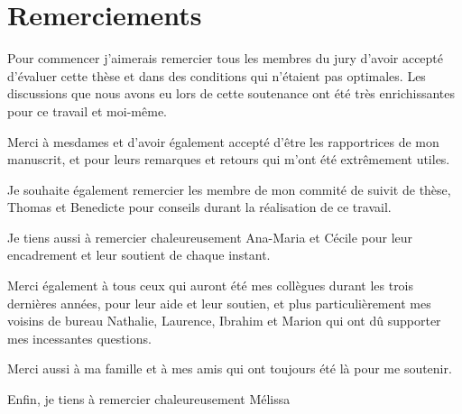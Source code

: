 \section*{Remerciements}

Pour commencer j'aimerais remercier tous les membres du jury d'avoir
accepté d'évaluer cette thèse et dans des conditions qui n'étaient pas
optimales. Les discussions que nous avons eu lors de cette soutenance
ont été très enrichissantes pour ce travail et moi-même.

Merci à mesdames  et  d'avoir
également accepté d'être les rapportrices de mon manuscrit, et pour
leurs remarques et retours qui m'ont été extrêmement utiles.

Je souhaite également remercier les membre de mon commité de suivit de
thèse, Thomas  et Benedicte  pour conseils
durant la réalisation de ce travail. 

Je tiens aussi à remercier chaleureusement Ana-Maria et Cécile pour
leur encadrement et leur soutient de chaque instant.

Merci également à tous ceux qui auront été mes collègues durant les
trois dernières années, pour leur aide et leur soutien, et plus
particulièrement mes voisins de bureau Nathalie, Laurence, Ibrahim et
Marion qui ont dû supporter mes incessantes questions.

Merci aussi à ma famille et à mes amis qui ont toujours été là pour me
soutenir.

Enfin, je tiens à remercier chaleureusement Mélissa 
